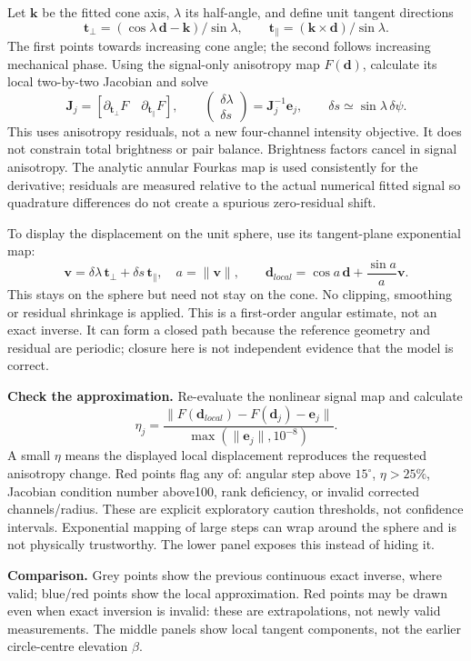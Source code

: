 \documentclass[10pt,a4paper]{article}
\begin{document}
Let $\mathbf k$ be the fitted cone axis, $\lambda$ its half-angle, and define unit tangent directions
\[\mathbf t_\perp=(\cos\lambda\,\mathbf d-\mathbf k)/\sin\lambda,\qquad \mathbf t_\parallel=(\mathbf k\times \mathbf d)/\sin\lambda.\]
The first points towards increasing cone angle; the second follows increasing mechanical phase. Using the signal-only anisotropy map $F(\mathbf d)$, calculate its local two-by-two Jacobian and solve
\[\mathbf J_j=\left[\partial_{\mathbf t_\perp}F\quad\partial_{\mathbf t_\parallel}F\right],\qquad
\begin{pmatrix}\delta\lambda\\\delta s\end{pmatrix}=\mathbf J_j^{-1}\mathbf e_j,
\qquad \delta s\simeq\sin\lambda\,\delta\psi.\]
This uses anisotropy residuals, not a new four-channel intensity objective. It does not constrain total brightness or pair balance. Brightness factors cancel in signal anisotropy. The analytic annular Fourkas map is used consistently for the derivative; residuals are measured relative to the actual numerical fitted signal so quadrature differences do not create a spurious zero-residual shift.

To display the displacement on the unit sphere, use its tangent-plane exponential map:
\[\mathbf v=\delta\lambda\,\mathbf t_\perp+\delta s\,\mathbf t_\parallel,\quad a=\|\mathbf v\|,\qquad
 \mathbf d_{local}=\cos a\,\mathbf d+\frac{\sin a}{a}\mathbf v.\]
This stays on the sphere but need not stay on the cone. No clipping, smoothing or residual shrinkage is applied. This is a first-order angular estimate, not an exact inverse. It can form a closed path because the reference geometry and residual are periodic; closure here is not independent evidence that the model is correct.

\textbf{Check the approximation.} Re-evaluate the nonlinear signal map and calculate
\[\eta_j=\frac{\|F(\mathbf d_{local})-F(\mathbf d_j)-\mathbf e_j\|}{\max(\|\mathbf e_j\|,10^{-8})}.\]
A small $\eta$ means the displayed local displacement reproduces the requested anisotropy change. Red points flag any of: angular step above $15^\circ$, $\eta>25\%$, Jacobian condition number above100, rank deficiency, or invalid corrected channels/radius. These are explicit exploratory caution thresholds, not confidence intervals. Exponential mapping of large steps can wrap around the sphere and is not physically trustworthy. The lower panel exposes this instead of hiding it.

\textbf{Comparison.} Grey points show the previous continuous exact inverse, where valid; blue/red points show the local approximation. Red points may be drawn even when exact inversion is invalid: these are extrapolations, not newly valid measurements. The middle panels show local tangent components, not the earlier circle-centre elevation $\beta$.
\end{document}
